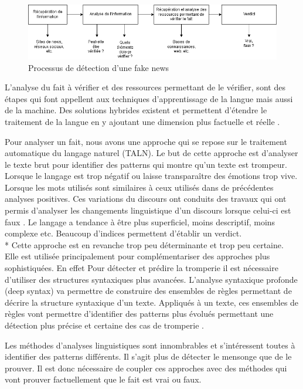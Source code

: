 \begin{figure}[ht]
\centering
\includegraphics[width=\textwidth, draft=false]{diagrams/fake_news_process.png}
\caption{Processus de détection d'une fake news}
\label{fake_news_process}
\end{figure}

L'analyse du fait à vérifier et des ressources permettant de le vérifier, sont des étapes qui font appellent aux techniques d'apprentissage de la langue mais aussi de la machine. Des solutions hybrides existent et permettent d'étendre le traitement de la langue en y ajoutant une dimension plus factuelle et réelle \cite{conroy2015automatic}.

Pour analyser un fait, nous avons une approche qui se repose sur le traitement automatique du langage naturel (TALN). Le but de cette approche est d'analyser le texte brut pour identifier des patterns qui montre qu'un texte est trompeur. Lorsque le langage est trop négatif ou laisse transparaître des émotions trop vive. Lorsque les mots utilisés sont similaires à ceux utilisés dans de précédentes analyses positives. Ces variations du discours ont conduits des travaux qui ont permis d'analyser les changements linguistique d'un discours lorsque celui-ci est faux \cite{markowitz2014linguistic}. Le langage a tendance à être plus superficiel, moins descriptif, moins complexe etc. Beaucoup d'indices permettent d'établir un verdict. 
\\*
Cette approche est en revanche trop peu déterminante et trop peu certaine. Elle est utilisée principalement pour complémentariser des approches plus sophistiquées. En effet Pour détecter et prédire la tromperie il est nécessaire d'utiliser des structures syntaxiques plus avancées. L'analyse syntaxique profonde (deep syntax) va permettre de construire des ensembles de règles permettant de décrire la structure syntaxique d'un texte. Appliqués à un texte, ces ensembles de règles vont permettre d'identifier des patterns plus évolués permettant une détection plus précise et certaine des cas de tromperie \cite{feng2012syntactic} \cite{collinsprobabilistic}.

Les méthodes d'analyses linguistiques sont innombrables et s'intéressent toutes à identifier des patterns différents. Il s'agit plus de détecter le mensonge que de le prouver. Il est donc nécessaire de coupler ces approches avec des méthodes qui vont prouver factuellement que le fait est vrai ou faux.

